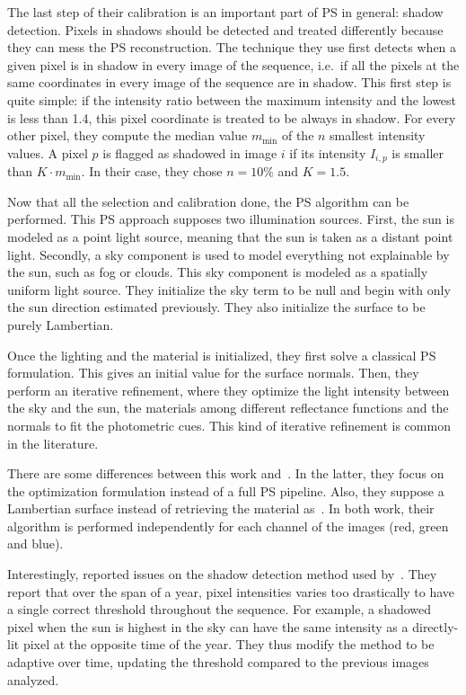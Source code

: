 The last step of their calibration is an important part of PS in general: shadow detection. Pixels in shadows should be detected and treated differently because they can mess the PS reconstruction. The technique they use first detects when a given pixel is in shadow in every image of the sequence, i.e.\ if all the pixels at the same coordinates in every image of the sequence are in shadow. This first step is quite simple: if the intensity ratio between the maximum intensity and the lowest is less than 1.4, this pixel coordinate is treated to be always in shadow. For every other pixel, they compute the median value $m_\mathrm{min}$ of the $n$ smallest intensity values. A pixel $p$ is flagged as shadowed in image $i$ if its intensity $I_{i,p}$ is smaller than $K \cdot m_\mathrm{min}$. In their case, they chose $n = 10\%$ and $K = 1.5$.

Now that all the selection and calibration done, the PS algorithm can be performed. This PS approach supposes two illumination sources. First, the sun is modeled as a point light source, meaning that the sun is taken as a distant point light. Secondly, a sky component is used to model everything not explainable by the sun, such as fog or clouds. This sky component is modeled as a spatially uniform light source. They initialize the sky term to be null and begin with only the sun direction estimated previously. They also initialize the surface to be purely Lambertian.

Once the lighting and the material is initialized, they first solve a classical PS formulation. This gives an initial value for the surface normals. Then, they perform an iterative refinement, where they optimize the light intensity between the sky and the sun, the materials among different reflectance functions and the normals to fit the photometric cues. This kind of iterative refinement is common in the literature.

There are some differences between this work and~\cite{abrams-eccv-12}. In the latter, they focus on the optimization formulation instead of a full PS pipeline. Also, they suppose a Lambertian surface instead of retrieving the material as~\cite{ackermann-cvpr-12}. In both work, their algorithm is performed independently for each channel of the images (red, green and blue).

Interestingly, \cite{abrams-eccv-12} reported issues on the shadow detection method used by~\cite{ackermann-cvpr-12}. They report that over the span of a year, pixel intensities varies too drastically to have a single correct threshold throughout the sequence. For example, a shadowed pixel when the sun is highest in the sky can have the same intensity as a directly-lit pixel at the opposite time of the year. They thus modify the method to be adaptive over time, updating the threshold compared to the previous images analyzed.

